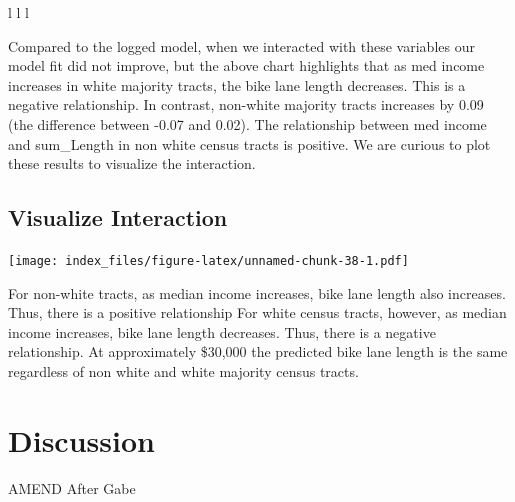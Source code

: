 \documentclass[
]{article}
\begin{document}
\begin{table}[ht]
\begin{centerbox}
\begin{threeparttable}
\begin{tabular}{l l l}
 \tabularnewline[-0.5pt]


\hhline{}
\end{tabular}
\end{threeparttable}\par\end{centerbox}

\end{table}
 

Compared to the logged model, when we interacted with these variables
our model fit did not improve, but the above chart highlights that as
med income increases in white majority tracts, the bike lane length
decreases. This is a negative relationship. In contrast, non-white
majority tracts increases by 0.09 (the difference between -0.07 and
0.02). The relationship between med income and sum\_Length in non white
census tracts is positive. We are curious to plot these results to
visualize the interaction.

\hypertarget{visualize-interaction}{%
\subsection{Visualize Interaction}\label{visualize-interaction}}

\texttt{[image: index\_files/figure-latex/unnamed-chunk-38-1.pdf]}

For non-white tracts, as median income increases, bike lane length also
increases. Thus, there is a positive relationship For white census
tracts, however, as median income increases, bike lane length decreases.
Thus, there is a negative relationship. At approximately \$30,000 the
predicted bike lane length is the same regardless of non white and white
majority census tracts.

\hypertarget{discussion}{%
\section{Discussion}\label{discussion}}

AMEND After Gabe
\end{document}
